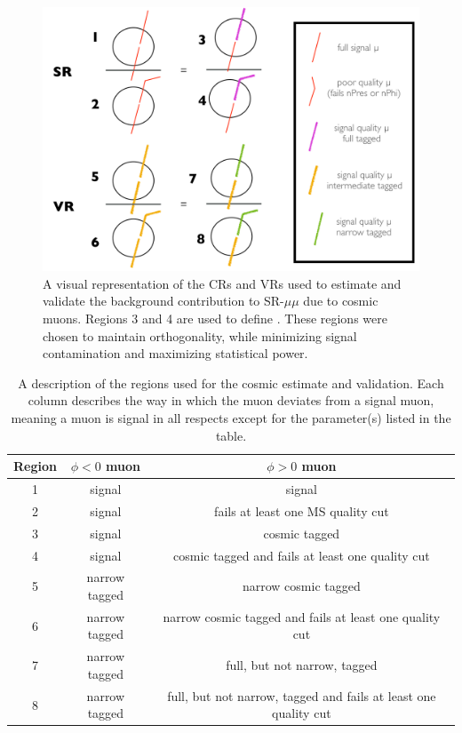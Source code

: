 \begin{figure}[!ht]
\centering
\includegraphics[width=.8\textwidth]{figures/cosmics/SR-VR-sketch.png}
\caption{A visual representation of the CRs and VRs used to estimate and validate the background contribution to SR-$\mu\mu$ due to cosmic muons. Regions 3 and 4 are used to define \rgood. These regions were chosen to maintain orthogonality, while minimizing signal contamination and maximizing statistical power.}
\label{fig:cosmic_SRVR}
\end{figure}

\begin{table}
\centering
\begin{tabular}{ccc}
Region & $\phi < 0$ muon & $\phi > 0$ muon \\
\hline
1 & signal & signal\\ 
2 & signal & fails at least one MS quality cut\\ 
3 & signal & cosmic tagged \\ 
4 & signal & cosmic tagged and fails at least one quality cut\\ 
5 & narrow tagged & narrow cosmic tagged\\ 
6 & narrow tagged & narrow cosmic tagged and fails at least one quality cut\\ 
7 & narrow tagged & full, but not narrow, tagged \\ 
8 & narrow tagged & full, but not narrow, tagged and fails at least one quality cut\\  
\hline
\end{tabular}
\caption{A description of the regions used for the cosmic estimate and validation. Each column describes the way in which the muon deviates from a signal muon, meaning a muon is signal in all respects except for the parameter(s) listed in the table.}
\label{tab:cosmic_SRVR}
\end{table}


